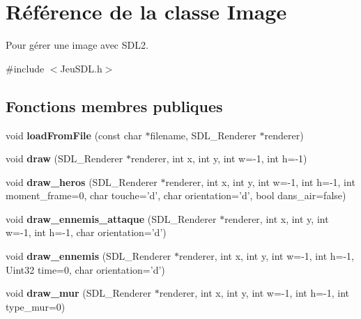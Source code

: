 \hypertarget{classImage}{\section{Référence de la classe Image}
\label{classImage}
}


Pour gérer une image avec S\+D\+L2.  




{\ttfamily \#include $<$Jeu\+S\+D\+L.\+h$>$}

\subsection*{Fonctions membres publiques}
\begin{DoxyCompactItemize}
\item 
\hypertarget{classImage_aa276b5183099671ddeaf8f083068046c}{void {\bfseries load\+From\+File} (const char $\ast$filename, S\+D\+L\+\_\+\+Renderer $\ast$renderer)}\label{classImage_aa276b5183099671ddeaf8f083068046c}

\item 
\hypertarget{classImage_a82d6936d466ba0161d8b9cbacf613de5}{void {\bfseries draw} (S\+D\+L\+\_\+\+Renderer $\ast$renderer, int x, int y, int w=-\/1, int h=-\/1)}\label{classImage_a82d6936d466ba0161d8b9cbacf613de5}

\item 
\hypertarget{classImage_a4e5eb72d730a44ddc5d20b0631f33356}{void {\bfseries draw\+\_\+heros} (S\+D\+L\+\_\+\+Renderer $\ast$renderer, int x, int y, int w=-\/1, int h=-\/1, int moment\+\_\+frame=0, char touche='d', char orientation='d', bool dans\+\_\+air=false)}\label{classImage_a4e5eb72d730a44ddc5d20b0631f33356}

\item 
\hypertarget{classImage_a4ef25d8c4533c18627fd10e543be0d5a}{void {\bfseries draw\+\_\+ennemis\+\_\+attaque} (S\+D\+L\+\_\+\+Renderer $\ast$renderer, int x, int y, int w=-\/1, int h=-\/1, char orientation='d')}\label{classImage_a4ef25d8c4533c18627fd10e543be0d5a}

\item 
\hypertarget{classImage_a70ae82ff2f54f047f8254c925294b9a9}{void {\bfseries draw\+\_\+ennemis} (S\+D\+L\+\_\+\+Renderer $\ast$renderer, int x, int y, int w=-\/1, int h=-\/1, Uint32 time=0, char orientation='d')}\label{classImage_a70ae82ff2f54f047f8254c925294b9a9}

\item 
\hypertarget{classImage_a45448b3e1b65efed79c6e5e5bc8b2ce2}{void {\bfseries draw\+\_\+mur} (S\+D\+L\+\_\+\+Renderer $\ast$renderer, int x, int y, int w=-\/1, int h=-\/1, int type\+\_\+mur=0)}\label{classImage_a45448b3e1b65efed79c6e5e5bc8b2ce2}


\end{DoxyCompactItemize}
